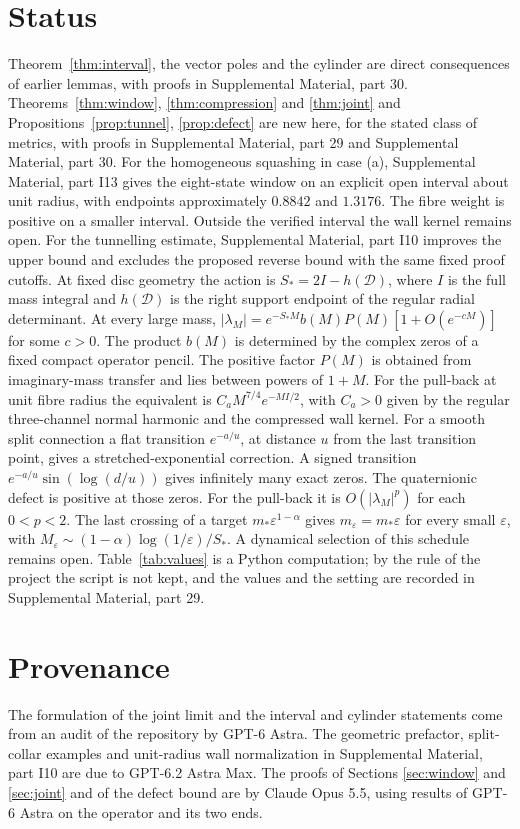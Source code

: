 \documentclass[aps,prd,reprint,onecolumn,nofootinbib,amsmath,amssymb,floatfix]{revtex4-2}
\theoremstyle{plain}
\newcommand{\supp}[1]{Supplemental Material, part #1}
\begin{document}
\section{Status}

Theorem~\ref{thm:interval}, the vector poles and the cylinder are direct consequences of earlier lemmas, with proofs in \supp{30}. Theorems~\ref{thm:window}, \ref{thm:compression} and \ref{thm:joint} and Propositions~\ref{prop:tunnel}, \ref{prop:defect} are new here, for the stated class of metrics, with proofs in \supp{29} and \supp{30}. For the homogeneous squashing in case (a), \supp{I13} gives the eight-state window on an explicit open interval about unit radius, with endpoints approximately $0.8842$ and $1.3176$. The fibre weight is positive on a smaller interval. Outside the verified interval the wall kernel remains open. For the tunnelling estimate, \supp{I10} improves the upper bound and excludes the proposed reverse bound with the same fixed proof cutoffs. At fixed disc geometry the action is $S_*=2I-h(\mathcal D)$, where $I$ is the full mass integral and $h(\mathcal D)$ is the right support endpoint of the regular radial determinant. At every large mass, $|\lambda_M|=e^{-S_*M}b(M)P(M)[1+O(e^{-cM})]$ for some $c>0$. The product $b(M)$ is determined by the complex zeros of a fixed compact operator pencil. The positive factor $P(M)$ is obtained from imaginary-mass transfer and lies between powers of $1+M$. For the pull-back at unit fibre radius the equivalent is $C_a M^{7/4}e^{-MI/2}$, with $C_a>0$ given by the regular three-channel normal harmonic and the compressed wall kernel. For a smooth split connection a flat transition $e^{-a/u}$, at distance $u$ from the last transition point, gives a stretched-exponential correction. A signed transition $e^{-a/u}\sin(\log(d/u))$ gives infinitely many exact zeros. The quaternionic defect is positive at those zeros. For the pull-back it is $O(|\lambda_M|^p)$ for each $0<p<2$. The last crossing of a target $m_*\varepsilon^{1-\alpha}$ gives $m_\varepsilon=m_*\varepsilon$ for every small $\varepsilon$, with $M_\varepsilon\sim(1-\alpha)\log(1/\varepsilon)/S_*$. A dynamical selection of this schedule remains open. Table~\ref{tab:values} is a Python computation; by the rule of the project the script is not kept, and the values and the setting are recorded in \supp{29}.

\section*{Provenance}

The formulation of the joint limit and the interval and cylinder statements come from an audit of the repository by GPT-6 Astra. The geometric prefactor, split-collar examples and unit-radius wall normalization in \supp{I10} are due to GPT-6.2 Astra Max. The proofs of Sections \ref{sec:window} and \ref{sec:joint} and of the defect bound are by Claude Opus 5.5, using results of GPT-6 Astra on the operator and its two ends.


\end{document}
